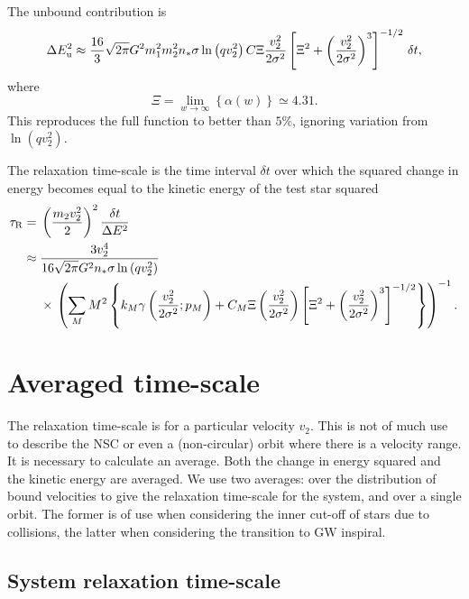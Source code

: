 The unbound contribution is
\begin{equation}
\Delta E_\mathrm{u}^2 \approx \dfrac{16}{3}\sqrt{2\pi}G^2m_1^2m_2^2n_\ast\sigma\ln\left(qv_2^2\right) C \Xi \dfrac{v_2^2}{2\sigma^2} \left[\Xi^2 + \left(\dfrac{v_2^2}{2\sigma^2}\right)^3\right]^{-1/2}\,\delta t,
\label{eq:Unbound-approx}
\end{equation}
where
\begin{equation}
\Xi = \lim_{w \rightarrow \infty}\left\{\alpha(w)\right\} \simeq 4.31.
\end{equation}
This reproduces the full function to better than $5\%$, ignoring variation from $\ln\left(qv_2^2\right)$.

The relaxation time-scale is the time interval $\delta t$ over which the squared change in energy becomes equal to the kinetic energy of the test star squared \citep{Bar-Or2012}
\begin{align}
\tau_\mathrm{R} = {} & \left(\dfrac{m_2v_2^2}{2}\right)^2\dfrac{\delta t}{\Delta E^2} \\
 \approx {} & \dfrac{3v_2^4}{16\sqrt{2\pi}G^2n_\ast\sigma\ln\left(qv_2^2\right)} \nonumber \\*
 {} & \times \left. \left(\sum_M M^2 \left\{k_M \gamma\left(\dfrac{v_2^2}{2\sigma^2};p_M\right) + C_M\Xi\left(\dfrac{v_2^2}{2\sigma^2}\right)\left[\Xi^2 + \left(\dfrac{v_2^2}{2\sigma^2}\right)^3\right]^{-1/2}\right\}\right)^{-1}. \right.
\label{eq:tau_R1}
\end{align}

\section{Averaged time-scale}

The relaxation time-scale  is for a particular velocity $v_2$. This is not of much use to describe the NSC or even a (non-circular) orbit where there is a velocity range. It is necessary to calculate an average. Both the change in energy squared and the kinetic energy are averaged. We use two averages: over the distribution of bound velocities to give the relaxation time-scale for the system, and over a single orbit. The former is of use when considering the inner cut-off of stars due to collisions, the latter when considering the transition to GW inspiral.

\subsection{System relaxation time-scale}\label{sec:system-ave}


